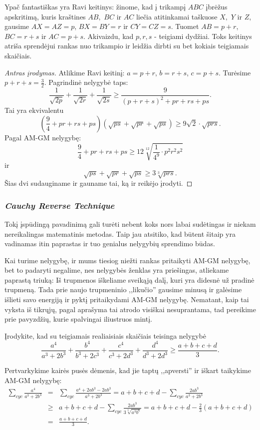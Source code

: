 Ypač fantastiškas yra Ravi keitinys: žinome, kad į trikampį $ABC$ įbrėžus
apskritimą, kuris kraštines $AB,$ $BC$ ir $AC$ liečia atitinkamai taškuose
$X,$ $Y$ ir $Z$, gausime $AX=AZ=p$, $BX=BY=r$ ir $CY=CZ=s$. Tuomet
$AB=p+r$, $BC=r+s$ ir $AC=p+s$. Akivaizdu, kad $p,r,s$ - teigiami dydžiai.
Toks keitinys atriša sprendėjui rankas nuo trikampio ir leidžia dirbti su
bet kokiais teigiamais skaičiais.

\begin{proof}[Antras įrodymas]
  Atlikime Ravi keitinį: $a=p+r$, $b=r+s$, $c=p+s$. Turėsime
  $p+r+s=\frac{3}{2}$. Pagrindinė nelygybė taps:
  $$\frac{1}{\sqrt{2p}}+\frac{1}{\sqrt{2r}}+\frac{1}{\sqrt{2s}}\geq\frac{9}{(p+r+s)^2+pr+rs+ps}.$$
  Tai yra ekvivalentu
  $$(\frac{9}{4}+pr+rs+ps)(\sqrt{ps}+\sqrt{pr}+\sqrt{ps})\geq9\sqrt{2}\cdot\sqrt{prs}.$$
  Pagal AM-GM nelygybę:
  $$\frac{9}{4}+pr+rs+ps\geq12\sqrt[12]{\frac{1}{4^9}\cdot p^2r^2s^2}$$ ir
  $$\sqrt{ps}+\sqrt{pr}+\sqrt{ps}\geq3\sqrt[3]{prs}.$$ Šias dvi sudauginame
  ir gauname tai, ką ir reikėjo įrodyti.
\end{proof}

\subsubsection{\textit{Cauchy Reverse Technique}}

Tokį įspūdingą pavadinimą gali turėti nebent koks nors labai sudėtingas ir
niekam nereikalingas matematinis metodas. Taip jau atsitiko, kad būtent
šitaip yra vadinamas itin paprastas ir tuo genialus nelygybių sprendimo
būdas.

Kai turime nelygybę, ir mums tiesiog niežti rankas pritaikyti AM-GM
nelygybę, bet to padaryti negalime, nes nelygybės ženklas yra priešingas,
atliekame paprastą triuką: Iš trupmenos iškeliame sveikąją dalį, kuri yra
didesnė už pradinė trupmeną. Tada prie naujo trupmeninio ,,likučio''
gausime minusą ir galėsime išlieti savo energiją ir pyktį pritaikydami
AM-GM nelygybę. Nematant, kaip tai vyksta iš tikrųjų, pagal aprašyma tai
atrodo visiškai nesuprantama, tad pereikime prie pavyzdžių, kurie
spalvingai iliustruos mintį.

\begin{pavnr}
  Įrodykite, kad su teigiamais realiaisiais skaičiais teisinga nelygybė
  $$\frac{a^4}{a^3+2b^3}+\frac{b^4}{b^3+2c^3}+\frac{c^4}{c^3+2d^3}+\frac{d^4}{d^3+2d^3}\geq\frac{a+b+c+d}{3}.$$
\end{pavnr}

\begin{sprendimas} Pertvarkykime kairės pusės dėmenis, kad jie taptų
  ,,apversti'' ir iškart taikykime AM-GM nelygybę:
  \begin{eqnarray*}
    \sum_{cyc}{\frac{a^4}{a^3+2b^3}}&=&\sum_{cyc}{\frac{a^4+2ab^3-2ab^3}{a^3+2b^3}}
    = a+b+c+d-\sum_{cyc}{\frac{2ab^3}{a^3+2b^3}}\\ &\geq&
    a+b+c+d-\sum_{cyc}{\frac{2ab^3}{3\sqrt[3]{a^3b^6}}}=a+b+c+d-\frac{2}{3}(a+b+c+d)\\&=&\frac{a+b+c+d}{3}.
  \end{eqnarray*}
\end{sprendimas}

